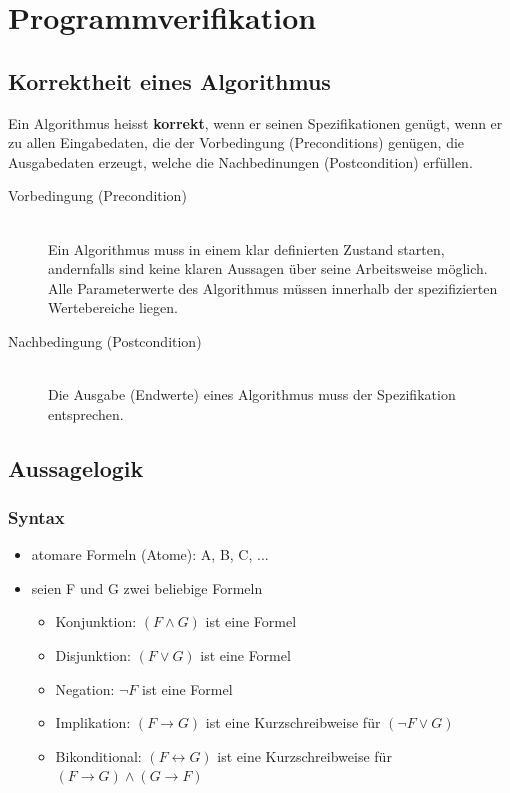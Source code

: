\documentclass[a4paper,10pt]{article}
\newcommand{\Bold}[1]{\textbf{#1}} %
\newcommand{\ra}{\rightarrow}
\begin{document}
\newpage
\section{Programmverifikation}
\subsection{Korrektheit eines Algorithmus}
Ein Algorithmus heisst \Bold {korrekt}, wenn er seinen Spezifikationen gen\"ugt, wenn er zu allen Eingabedaten, die der Vorbedingung (Preconditions) gen\"ugen, die Ausgabedaten erzeugt, welche die Nachbedinungen (Postcondition) erf\"ullen. 
\begin{description}
	\item[Vorbedingung (Precondition)] \hfill \\
		Ein Algorithmus muss in einem klar definierten Zustand starten, andernfalls sind keine klaren Aussagen \"uber seine Arbeitsweise m\"oglich. Alle Parameterwerte des Algorithmus m\"ussen innerhalb der spezifizierten Wertebereiche liegen.
	\item[Nachbedingung (Postcondition)] \hfill \\
		Die Ausgabe (Endwerte) eines Algorithmus muss der Spezifikation entsprechen.
\end{description}

\subsection{Aussagelogik}
\subsubsection{Syntax}
		\begin{itemize}
			\item atomare Formeln (Atome): A, B, C, ...
			\item seien F und G zwei beliebige Formeln
				\begin{itemize}
					\item Konjunktion: $(F \wedge G)$ ist eine Formel
					\item Disjunktion: $(F \vee G)$ ist eine Formel
					\item Negation: $\neg F$ ist eine Formel
					\item Implikation: $(F \rightarrow G)$ ist eine Kurzschreibweise f\"ur $(\neg F \vee G)$
					\item Bikonditional: $(F \leftrightarrow G)$ ist eine Kurzschreibweise f\"ur $(F \ra G) \wedge (G \ra F)$
				\end{itemize}
		\end{itemize}
		
\end{document}

